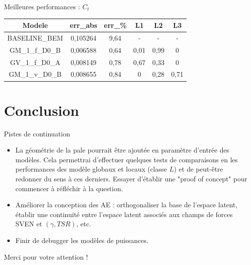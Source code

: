 \documentclass[
11pt,notheorems,hyperref={pdfauthor=whatever}
]{beamer}
\begin{document}
\begin{frame}{Meilleures performances : $C_t$}
    
    \centering
    \begin{tabular}{|c|c|c|c|c|c|}
    \hline
    Modele & err\_abs & err\_\% & L1 & L2 & L3 \\
    \hline
    BASELINE\_BEM & 0,105264 & 9,64 & - & - & - \\
    \hline
    GM\_1\_f\_D0\_B & 0,006588 & 0,64 & 0,01 & 0,99 & 0 \\
    GV\_1\_f\_D0\_A & 0,008149 & 0,78 & 0,67 & 0,33 & 0 \\
    GM\_1\_v\_D0\_B & 0,008655 & 0,84 & 0 & 0,28 & 0,71 \\        
    \hline
    \end{tabular}

\end{frame}


\section{Conclusion}

\begin{frame}{Pistes de continuation}
    \begin{itemize}
        \item La géométrie de la pale pourrait être ajoutée en paramètre d'entrée des modèles. Cela permettrai d'effectuer quelques
            tests de comparaisons en les performances des modèle globaux et locaux (classe $L$) et de peut-être redonner du sens à ces derniers. 
            Essayer d'établir une "proof of concept" pour commencer à réfléchir à la question.
        \item Améliorer la conception des AE : orthogonaliser la base de l'espace latent, établir une continuité entre l'espace latent associés aux champs de forces
               SVEN et $(\gamma, TSR)$, etc.
        \item Finir de debugger les modèles de puissances.
        \end{itemize}
\end{frame}

\begin{frame}{Merci pour votre attention !}
    
\end{frame}
\end{document}
